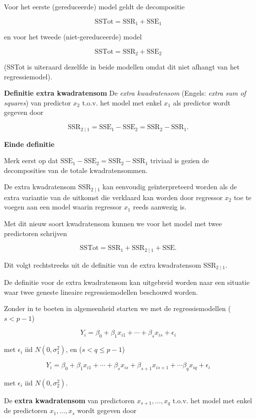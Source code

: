 \documentclass[
  12pt,dutch]{book}
\theoremstyle{definition}
\theoremstyle{definition}
\theoremstyle{definition}
\theoremstyle{definition}
\theoremstyle{remark}
\begin{document}
Voor het eerste (gereduceerde) model geldt de decompositie

\[
  \text{SSTot} = \text{SSR}_1 + \text{SSE}_1
\]

en voor het tweede (niet-gereduceerde) model

\[
  \text{SSTot} = \text{SSR}_2 + \text{SSE}_2
\]

(SSTot is uiteraard dezelfde in beide modellen omdat dit niet afhangt van het regressiemodel).

\textbf{Definitie extra kwadratensom}
De \emph{extra kwadratensom} (Engels: \emph{extra sum of squares}) van predictor \(x_2\) t.o.v. het model met enkel \(x_1\) als predictor wordt gegeven door

\[
  \text{SSR}_{2\mid 1} = \text{SSE}_1-\text{SSE}_2=\text{SSR}_2-\text{SSR}_1.
\]

\textbf{Einde definitie}

Merk eerst op dat \(\text{SSE}_1-\text{SSE}_2=\text{SSR}_2-\text{SSR}_1\) triviaal is gezien de decomposities van de totale kwadratensommen.

De extra kwadratensom \(\text{SSR}_{2\mid 1}\) kan eenvoudig geïnterpreteerd worden als de extra variantie van de uitkomst die verklaard kan worden door regressor \(x_2\) toe te voegen aan een model waarin regressor \(x_1\) reeds aanwezig is.

Met dit nieuw soort kwadratensom kunnen we voor het model met twee predictoren schrijven

\[
  \text{SSTot} = \text{SSR}_1+ \text{SSR}_{2\mid 1} + \text{SSE}.
\]

Dit volgt rechtstreeks uit de definitie van de extra kwadratensom \(\text{SSR}_{2\mid 1}\).

De definitie voor de extra kwadratensom kan uitgebreid worden naar een situatie waar twee geneste lineaire regressiemodellen beschouwd worden.

Zonder in te boeten in algemeenheid starten we met de regressiemodellen (\(s<p-1\))

\[
Y_i = \beta_0 + \beta_1 x_{i1} + \cdots + \beta_{s} x_{is} + \epsilon_i
\]

met \(\epsilon_i\text{ iid }N(0,\sigma_1^{2})\), en (\(s< q\leq p-1\))

\[
Y_i = \beta_0 + \beta_1 x_{i1} + \cdots + \beta_{s} x_{is} + \beta_{s+1} x_{is+1} + \cdots \beta_{q}x_{iq}+ \epsilon_i
\]

met \(\epsilon_i\text{ iid } N(0,\sigma_2^{2})\).

De \textbf{extra kwadratensom} van predictoren \(x_{s+1}, \ldots, x_q\) t.o.v. het model met enkel de predictoren \(x_1,\ldots, x_{s}\) wordt gegeven door
\end{document}
